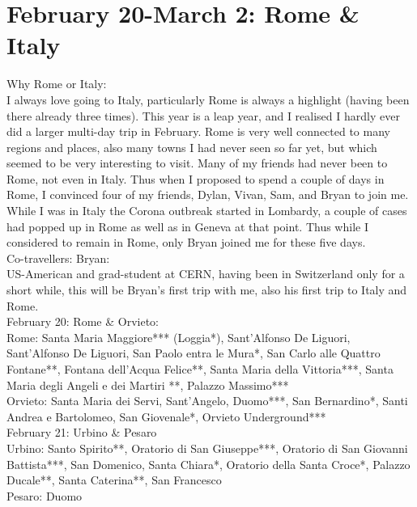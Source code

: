 \section{February 20-March 2: Rome \& Italy}
\label{2020:Rome}

Why Rome or Italy:\\
I always love going to Italy, particularly Rome is always a highlight (having been there already three times). This year is a leap year, and I realised I hardly ever did a larger multi-day trip in February. Rome is very well connected to many regions and places, also many towns I had never seen so far yet, but which seemed to be very interesting to visit. Many of my friends had never been to Rome, not even in Italy. Thus when I proposed to spend a couple of days in Rome, I convinced four of my friends, Dylan, Vivan, Sam, and Bryan to join me. While I was in Italy the Corona outbreak started in Lombardy, a couple of cases had popped up in Rome as well as in Geneva at that point. Thus while I considered to remain in Rome, only Bryan joined me for these five days. \\

Co-travellers: Bryan:\\
US-American and grad-student at CERN, having been in Switzerland only for a short while, this will be Bryan's first trip with me, also his first trip to Italy and Rome.\\

February 20: Rome \& Orvieto:\\%

Rome: Santa Maria Maggiore*** (Loggia*), Sant'Alfonso De Liguori, Sant'Alfonso De Liguori, San Paolo entra le Mura*, San Carlo alle Quattro Fontane**, Fontana dell'Acqua Felice**, Santa Maria della Vittoria***, Santa Maria degli Angeli e dei Martiri
**, Palazzo Massimo***\\%
Orvieto: Santa Maria dei Servi, Sant'Angelo, Duomo***, San Bernardino*, Santi Andrea e Bartolomeo, San Giovenale*, Orvieto Underground***\\%

February 21: Urbino \& Pesaro\\%

Urbino: Santo Spirito**, Oratorio di San Giuseppe***, Oratorio di San Giovanni Battista***, San Domenico, Santa Chiara*, Oratorio della Santa Croce*, Palazzo Ducale**, Santa Caterina**, San Francesco\\%
Pesaro: Duomo\\%

